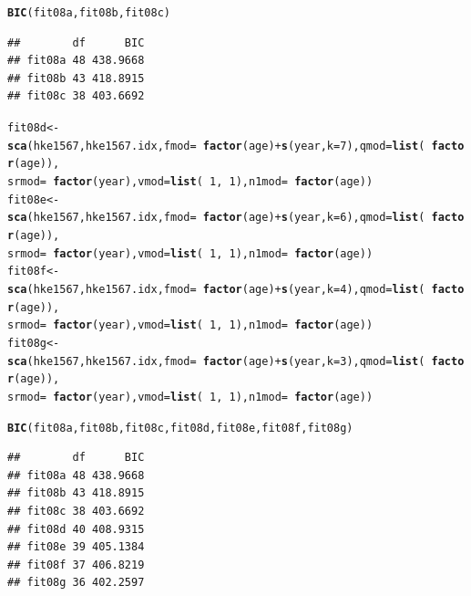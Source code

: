 \documentclass[a4paper,english,11pt]{article}\usepackage[]{graphicx}\usepackage[]{xcolor}
\makeatletter
\newcommand{\hlnum}[1]{\textcolor[rgb]{0.686,0.059,0.569}{#1}}%
\newcommand{\hlopt}[1]{\textcolor[rgb]{0,0,0}{#1}}%
\newcommand{\hldef}[1]{\textcolor[rgb]{0.345,0.345,0.345}{#1}}%
\newcommand{\hlkwb}[1]{\textcolor[rgb]{0.69,0.353,0.396}{#1}}%
\newcommand{\hlkwc}[1]{\textcolor[rgb]{0.333,0.667,0.333}{#1}}%
\newcommand{\hlkwd}[1]{\textcolor[rgb]{0.737,0.353,0.396}{\textbf{#1}}}%
\newenvironment{kframe}{%
 \def\at@end@of@kframe{}%
 \ifinner\ifhmode%
  \def\at@end@of@kframe{\end{minipage}}%
  \begin{minipage}{\columnwidth}%
 \fi\fi%
 \def\FrameCommand##1{\hskip\@totalleftmargin \hskip-\fboxsep
 \colorbox{shadecolor}{##1}\hskip-\fboxsep
     \hskip-\linewidth \hskip-\@totalleftmargin \hskip\columnwidth}%
 \MakeFramed {\advance\hsize-\width
   \@totalleftmargin\z@ \linewidth\hsize
   \@setminipage}}%
 {\par\unskip\endMakeFramed%
 \at@end@of@kframe}
\newenvironment{knitrout}{}{} %
\makeatother
\begin{document}
\begin{knitrout}
\begin{kframe}
\begin{alltt}
\hlkwd{BIC}\hldef{(fit08a, fit08b, fit08c)}
\end{alltt}
\begin{verbatim}
##        df      BIC
## fit08a 48 438.9668
## fit08b 43 418.8915
## fit08c 38 403.6692
\end{verbatim}
\begin{alltt}
\hldef{fit08d} \hlkwb{<-} \hlkwd{sca}\hldef{(hke1567, hke1567.idx,} \hlkwc{fmod} \hldef{=} \hlopt{~}\hlkwd{factor}\hldef{(age)} \hlopt{+} \hlkwd{s}\hldef{(year,} \hlkwc{k} \hldef{=} \hlnum{7}\hldef{),} \hlkwc{qmod} \hldef{=} \hlkwd{list}\hldef{(}\hlopt{~}\hlkwd{factor}\hldef{(age)),}
    \hlkwc{srmod} \hldef{=} \hlopt{~}\hlkwd{factor}\hldef{(year),} \hlkwc{vmod} \hldef{=} \hlkwd{list}\hldef{(}\hlopt{~}\hlnum{1}\hldef{,} \hlopt{~}\hlnum{1}\hldef{),} \hlkwc{n1mod} \hldef{=} \hlopt{~}\hlkwd{factor}\hldef{(age))}
\hldef{fit08e} \hlkwb{<-} \hlkwd{sca}\hldef{(hke1567, hke1567.idx,} \hlkwc{fmod} \hldef{=} \hlopt{~}\hlkwd{factor}\hldef{(age)} \hlopt{+} \hlkwd{s}\hldef{(year,} \hlkwc{k} \hldef{=} \hlnum{6}\hldef{),} \hlkwc{qmod} \hldef{=} \hlkwd{list}\hldef{(}\hlopt{~}\hlkwd{factor}\hldef{(age)),}
    \hlkwc{srmod} \hldef{=} \hlopt{~}\hlkwd{factor}\hldef{(year),} \hlkwc{vmod} \hldef{=} \hlkwd{list}\hldef{(}\hlopt{~}\hlnum{1}\hldef{,} \hlopt{~}\hlnum{1}\hldef{),} \hlkwc{n1mod} \hldef{=} \hlopt{~}\hlkwd{factor}\hldef{(age))}
\hldef{fit08f} \hlkwb{<-} \hlkwd{sca}\hldef{(hke1567, hke1567.idx,} \hlkwc{fmod} \hldef{=} \hlopt{~}\hlkwd{factor}\hldef{(age)} \hlopt{+} \hlkwd{s}\hldef{(year,} \hlkwc{k} \hldef{=} \hlnum{4}\hldef{),} \hlkwc{qmod} \hldef{=} \hlkwd{list}\hldef{(}\hlopt{~}\hlkwd{factor}\hldef{(age)),}
    \hlkwc{srmod} \hldef{=} \hlopt{~}\hlkwd{factor}\hldef{(year),} \hlkwc{vmod} \hldef{=} \hlkwd{list}\hldef{(}\hlopt{~}\hlnum{1}\hldef{,} \hlopt{~}\hlnum{1}\hldef{),} \hlkwc{n1mod} \hldef{=} \hlopt{~}\hlkwd{factor}\hldef{(age))}
\hldef{fit08g} \hlkwb{<-} \hlkwd{sca}\hldef{(hke1567, hke1567.idx,} \hlkwc{fmod} \hldef{=} \hlopt{~}\hlkwd{factor}\hldef{(age)} \hlopt{+} \hlkwd{s}\hldef{(year,} \hlkwc{k} \hldef{=} \hlnum{3}\hldef{),} \hlkwc{qmod} \hldef{=} \hlkwd{list}\hldef{(}\hlopt{~}\hlkwd{factor}\hldef{(age)),}
    \hlkwc{srmod} \hldef{=} \hlopt{~}\hlkwd{factor}\hldef{(year),} \hlkwc{vmod} \hldef{=} \hlkwd{list}\hldef{(}\hlopt{~}\hlnum{1}\hldef{,} \hlopt{~}\hlnum{1}\hldef{),} \hlkwc{n1mod} \hldef{=} \hlopt{~}\hlkwd{factor}\hldef{(age))}

\hlkwd{BIC}\hldef{(fit08a, fit08b, fit08c, fit08d, fit08e, fit08f, fit08g)}
\end{alltt}
\begin{verbatim}
##        df      BIC
## fit08a 48 438.9668
## fit08b 43 418.8915
## fit08c 38 403.6692
## fit08d 40 408.9315
## fit08e 39 405.1384
## fit08f 37 406.8219
## fit08g 36 402.2597
\end{verbatim}
\end{kframe}
\end{knitrout}
\end{document}
